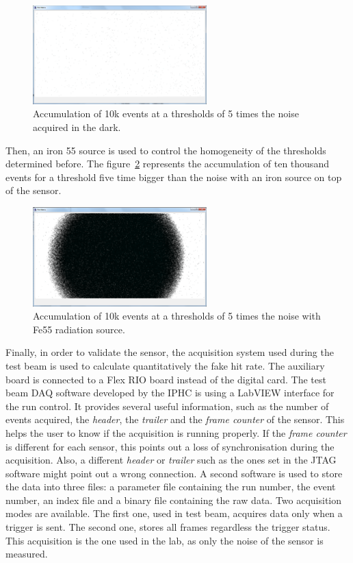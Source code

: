    \begin{figure}[!h]
    \centering
    \includegraphics[width=0.6\textwidth]{Pictures/labTests/dark_10kEvents_not_noisy.png}
    \caption{Accumulation of 10k events at a thresholds of 5 times the noise acquired in the dark.}
    \label{fig:darkEvents}
  \end{figure}

  Then, an iron 55 source is used to control the homogeneity of the thresholds determined before.
  The figure~\ref{fig:fe55} represents the accumulation of ten thousand events for a threshold five time bigger than the noise with an iron source on top of the sensor.
  
  \begin{figure}[!h]
    \centering
    \includegraphics[width=0.6\textwidth]{Pictures/labTests/10kEvents_Fe55_cut5sigma.png}
    \caption{Accumulation of 10k events at a thresholds of 5 times the noise with Fe55 radiation source.}
    \label{fig:fe55}
  \end{figure}

  Finally, in order to validate the sensor, the acquisition system used during the test beam is used to calculate quantitatively the fake hit rate.
  The auxiliary board is connected to a  Flex RIO board instead of the digital card.
  The test beam DAQ software developed by the IPHC is using a LabVIEW interface for the run control.
  It provides several useful information, such as the number of events acquired, the \textit{header}, the \textit{trailer} and the \textit{frame counter} of the sensor.
  This helps the user to know if the acquisition is running properly.
  If the \textit{frame counter} is different for each sensor, this points out a loss of synchronisation during the acquisition.
  Also, a different \textit{header} or \textit{trailer} such as the ones set in the JTAG software might point out a wrong connection.
  A second software is used to store the data into three files: a parameter file containing the run number, the event number, an index file and a binary file containing the raw data.
  Two acquisition modes are available. 
  The first one, used in test beam, acquires data only when a trigger is sent.
  The second one, stores all frames regardless the trigger status. 
  This acquisition is the one used in the lab, as only the noise of the sensor is measured.
   
